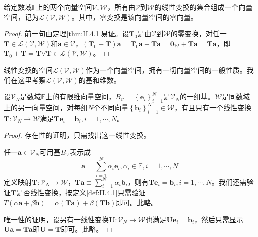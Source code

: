 \documentclass[main.tex]{subfiles}
\begin{document}
\begin{corollary}
给定数域$\mathbb{F}$上的两个向量空间$\mathcal{V},\mathcal{W}$，所有由$\mathcal{V}$到$\mathcal{W}$的线性变换的集合组成一个向量空间，记为$\mathcal{L}\left(\mathcal{V},\mathcal{W}\right)$。其中，零变换是该向量空间的零向量。
\end{corollary}
\begin{proof}
前一句由定理\ref{thm:II.4.1}易证。设$\mathbf{T}_0$是由$\mathcal{V}$到$\mathcal{W}$的零变换，对任一$\mathbf{T}\in\mathcal{L}\left(\mathcal{V},\mathcal{W}\right)$和$\mathbf{a}\in\mathcal{V}$，$\left(\mathbf{T}_0+\mathbf{T}\right)\mathbf{a}=\mathbf{T}_0\mathbf{a}+\mathbf{Ta}=\mathbf{0}_\mathcal{W}+\mathbf{Ta}=\mathbf{Ta}$，即$\mathbf{T}_0+\mathbf{T}=\mathbf{T}\forall\mathbf{T}\in\mathcal{L}\left(\mathcal{V},\mathcal{W}\right)$。
\end{proof}

线性变换的空间$\mathcal{L}\left(\mathcal{V},\mathcal{W}\right)$作为一个向量空间，拥有一切向量空间的一般性质。我们在这里考察$\mathcal{L}\left(\mathcal{V},\mathcal{W}\right)$的基和维数。

\begin{theorem}\label{thm:II.4.2}
设$\mathcal{V}_N$是数域$\mathbb{F}$上的有限维向量空间，$B_\mathcal{V}=\left\{\mathbf{e}_i\right\}_{i=1}^N$是$\mathcal{V}_N$的一组基。$\mathcal{W}$是同数域上的另一向量空间，对每组$N$个不同向量$\left\{\mathbf{b}_i\right\}_{i=1}^N\in\mathcal{W}$，有且只有一个线性变换$\mathbf{T}:\mathcal{V}_N\rightarrow\mathcal{W}$满足$\mathbf{Te}_i=\mathbf{b}_i,i=1,\cdots,N$。
\end{theorem}
\begin{proof}
存在性的证明，只需找出这一线性变换。

任一$\mathbf{a}\in\mathcal{V}_N$可用基$B_\mathcal{V}$表示成
\[\mathbf{a}=\sum_{i=1}^N\alpha_i\mathbf{e}_i,\alpha_i\in\mathbb{F},i=1,\cdots,N\]
定义映射$\mathbf{T}:\mathcal{V}_N\rightarrow\mathcal{W}，\mathbf{Ta}\equiv\sum_{i=1}^N\alpha_i\mathbf{b}_i$，则有$\mathbf{Te}_i=\mathbf{b}_i,i=1,\cdots,N$。我们还需验证$\mathbf{T}$是否线性变换，按定义\ref{def:II.4.1}只需验证$T\left(\alpha\mathbf{a}+\beta\mathbf{b}\right)=\alpha\left(\mathbf{Ta}\right)+\beta\left(\mathbf{Tb}\right)$即可。此略。

唯一性的证明，设另有一线性变换$\mathbf{U}:\mathcal{V}_N\rightarrow\mathcal{W}$也满足$\mathbf{Ue}_i=\mathbf{b}_i$，然后只需显示$\mathbf{Ua}=\mathbf{Ta}$即$\mathbf{U}=\mathbf{T}$即可。此略。
\end{proof}
\end{document}
